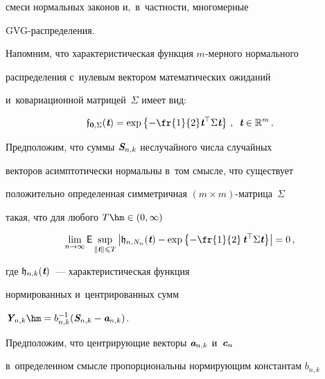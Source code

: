 смеси нормальных законов и,~в~частности, многомерные


GVG-рас\-пре\-де\-ления.





Напомним, что характеристическая функция $m$-мер\-но\-го нормального


распределения с~нулевым вектором математических ожиданий


и~ковариационной матрицей~$\Sigma$ имеет вид:





\noindent


$$


\mathfrak{f}_{\bO,\Sigma}(\vt)=\exp\left\{-\fr{1}{2}\vt^{\top}\Sigma\vt\right\}\,,\enskip


\vt\in\mathbb{R}^m\,.


$$


Предположим, что суммы $\emph{\textbf{S}}_{n,k}$ неслучайного числа случайных


векторов асимптотически нормальны в~том смысле, что существует


положительно определенная симметричная $(m\times m)$-мат\-ри\-ца~$\Sigma$


такая, что для любого $T\hm\in(0,\infty)$





\noindent


\begin{equation}


\lim\limits_{n\to\infty}{\sf E}\sup\limits_{\|\vt\|\leqslant


T}\left\vert\mathfrak{h}_{n,N_n}(\vt)-


\exp\left\{-\fr{1}{2}\,\vt^{\top}\Sigma\vt\right\}\right\vert=0\,,


\label{e10-kor}


\end{equation}


где $\mathfrak{h}_{n,k}(\emph{\textbf{t}})$~--- характеристическая функция


нормированных и~центрированных сумм


$\vY_{n,k}\hm=b_{n,k}^{-1}(\vS_{n,k}-\va_{n,k})$.








Предположим, что центрирующие векторы $\emph{\textbf{a}}_{n,k}$ и~$\emph{\textbf{c}}_n$


в~определенном смысле пропорциональны нормирующим константам $b_{n,k}$



